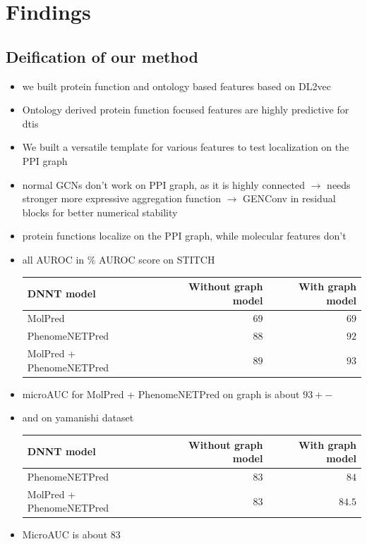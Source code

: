 \documentclass{bioinfo}
\begin{document}
\section{Findings}

\subsection{Deification of our method}
\begin{itemize}
	\item we built protein function and ontology based features based on DL2vec
	\item Ontology derived protein function focused features are highly predictive for dtis
	\item We built a versatile template for various features to test localization on the PPI graph
	\item normal GCNs don't work on PPI graph, as it is highly connected $\rightarrow$ needs stronger more expressive aggregation function $\rightarrow$ GENConv in residual blocks for better numerical stability
	\item protein functions localize on the PPI graph, while molecular features don't
	\item all AUROC in \% AUROC score on STITCH
	
	\begin{tabular}{|l|r|r|}
		\hline
		DNNT model&Without graph model&With graph model\\
		\hline
		MolPred&$69$&$69$\\
		PhenomeNETPred&$88$&$92$\\
		\hline
		MolPred + PhenomeNETPred & $89$ & $93$\\
		\hline
	\end{tabular}
	\item microAUC for MolPred + PhenomeNETPred on graph is about $93+-$
	\item and on yamanishi dataset
	
	\begin{tabular}{|l|r|r|}
		\hline
		DNNT model&Without graph model&With graph model\\
		\hline
		PhenomeNETPred&$83$&$84$\\
		\hline
		MolPred + PhenomeNETPred & $83$ & $84.5$\\
		\hline
	\end{tabular}
	\item MicroAUC is about $83$
\end{itemize}
\end{document}
